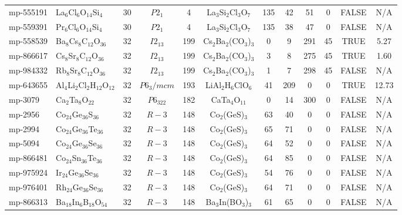 {\begin{longtable}{llcccccccccc}
    mp-555191 & La$_{6}$Cl$_{6}$O$_{14}$Si$_{4}$ & 30    & $P2_1$ & 4     & La$_{3}$Si$_{2}$Cl$_{3}$O$_{7}$ & 135   & 42    & 51    & 0     & FALSE & N/A \\
    mp-559391 & Pr$_{6}$Cl$_{6}$O$_{14}$Si$_{4}$ & 30    & $P2_1$ & 4     & La$_{3}$Si$_{2}$Cl$_{3}$O$_{7}$ & 135   & 38    & 47    & 0     & FALSE & N/A \\
    mp-558539 & Ba$_{8}$Cs$_{8}$C$_{12}$O$_{36}$ & 32    & $I2_13$ & 199   & Cs$_{2}$Ba$_{2}$(CO$_{3}$)$_{3}$ & 0     & 9     & 291   & 45    & TRUE  & 5.27  \\
    mp-866617 & Cs$_{8}$Sr$_{8}$C$_{12}$O$_{36}$ & 32    & $I2_13$ & 199   & Cs$_{2}$Ba$_{2}$(CO$_{3}$)$_{3}$ & 3     & 8     & 275   & 45    & TRUE  & 1.60  \\
    mp-984332 & Rb$_{8}$Sr$_{8}$C$_{12}$O$_{36}$ & 32    & $I2_13$ & 199   & Cs$_{2}$Ba$_{2}$(CO$_{3}$)$_{3}$ & 1     & 7     & 298   & 45    & FALSE & N/A \\
    mp-643655 & Al$_{4}$Li$_{2}$Cl$_{2}$H$_{12}$O$_{12}$ & 32    & $P6_3/mcm$ & 193   & LiAl$_{2}$H$_{6}$ClO$_{6}$ & 41    & 209   & 0     & 0     & TRUE  & 12.73  \\
    mp-3079 & Ca$_{2}$Ta$_{8}$O$_{22}$ & 32    & $P6_322$ & 182   & CaTa$_{4}$O$_{11}$ & 0     & 14    & 300   & 0     & FALSE & N/A \\
    mp-2956 & Co$_{24}$Ge$_{36}$S$_{36}$ & 32    & $R-3$ & 148   & Co$_{2}$(GeS)$_{3}$ & 63    & 40    & 0     & 0     & FALSE & N/A \\
    mp-2994 & Co$_{24}$Ge$_{36}$Te$_{36}$ & 32    & $R-3$ & 148   & Co$_{2}$(GeS)$_{3}$ & 65    & 71    & 0     & 0     & FALSE & N/A \\
    mp-5094 & Co$_{24}$Ge$_{36}$Se$_{36}$ & 32    & $R-3$ & 148   & Co$_{2}$(GeS)$_{3}$ & 64    & 52    & 0     & 0     & FALSE & N/A \\
    mp-866481 & Co$_{24}$Sn$_{36}$Te$_{36}$ & 32    & $R-3$ & 148   & Co$_{2}$(GeS)$_{3}$ & 64    & 85    & 0     & 0     & FALSE & N/A \\
    mp-975924 & Ir$_{24}$Ge$_{36}$Se$_{36}$ & 32    & $R-3$ & 148   & Co$_{2}$(GeS)$_{3}$ & 54    & 76    & 0     & 0     & FALSE & N/A \\
    mp-976401 & Rh$_{24}$Ge$_{36}$Se$_{36}$ & 32    & $R-3$ & 148   & Co$_{2}$(GeS)$_{3}$ & 64    & 71    & 0     & 0     & FALSE & N/A \\
    mp-866313 & Ba$_{18}$In$_{6}$B$_{18}$O$_{54}$ & 32    & $R-3$ & 148   & Ba$_{3}$In(BO$_{3}$)$_{3}$ & 61    & 65    & 0     & 0     & FALSE & N/A \\

\end{longtable}}
